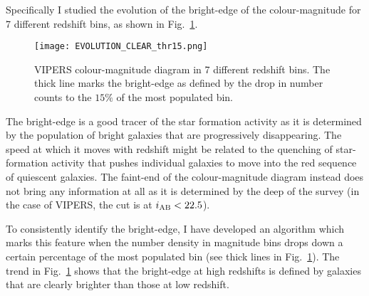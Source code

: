 \documentclass[11pt]{article}
\begin{document}
 Specifically I studied the evolution of the bright-edge of the colour-magnitude for 7 different redshift bins, as shown in Fig.~\ref{fig:vipers}. 
\begin{figure}
\centering
\texttt{[image: EVOLUTION\_CLEAR\_thr15.png]}
\caption{VIPERS colour-magnitude diagram in 7 different redshift bins. The thick line marks the bright-edge as defined by the drop in number counts to the $15\%$ of the most populated bin.}
\label{fig:vipers}
\end{figure}
 The bright-edge is a good tracer of the star formation activity as it is determined by the population of bright galaxies that are progressively disappearing. The speed at which it moves with redshift might be related to the quenching of star-formation activity that pushes individual galaxies to move into the red sequence of quiescent galaxies. The faint-end of the colour-magnitude diagram instead does not bring any information at all as it is determined by the deep of the survey (in the case of VIPERS, the cut is at $i_{\rm{AB}}<22.5$). 

To consistently identify the bright-edge, I have developed an algorithm which marks this feature when the number density in magnitude bins drops down a certain percentage of the most populated bin (see thick lines in Fig.~\ref{fig:vipers}). 
The trend in Fig.~\ref{fig:vipers} shows that the bright-edge at high redshifts is defined by galaxies that are clearly brighter than those at low redshift. 
\end{document}
